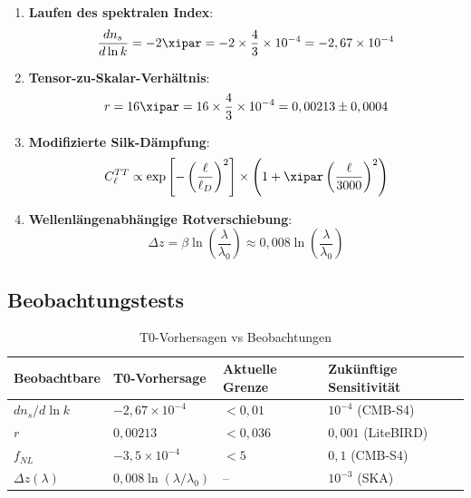 	\begin{enumerate}
		\item \textbf{Laufen des spektralen Index}:
		\begin{equation}
			\frac{dn_s}{d\ln k} = -2\xipar = -2 \times \frac{4}{3} \times 10^{-4} = -2,67 \times 10^{-4}
		\end{equation}
		
		\item \textbf{Tensor-zu-Skalar-Verhältnis}:
		\begin{equation}
			r = 16\xipar = 16 \times \frac{4}{3} \times 10^{-4} = 0,00213 \pm 0,0004
		\end{equation}
		
		\item \textbf{Modifizierte Silk-Dämpfung}:
		\begin{equation}
			C_\ell^{TT} \propto \exp\left[-\left(\frac{\ell}{\ell_D}\right)^2\right] \times \left(1 + \xipar \left(\frac{\ell}{3000}\right)^2\right)
		\end{equation}
		
		\item \textbf{Wellenlängenabhängige Rotverschiebung}:
		\begin{equation}
			\Delta z = \beta \ln\left(\frac{\lambda}{\lambda_0}\right) \approx 0,008 \ln\left(\frac{\lambda}{\lambda_0}\right)
		\end{equation}
	\end{enumerate}
	
	\subsection{Beobachtungstests}
	
	\begin{table}[htbp]
		\centering
		\caption{T0-Vorhersagen vs Beobachtungen}
		\begin{tabular}{p{3cm}p{3cm}p{3cm}p{3cm}}
			\toprule
			Beobachtbare & T0-Vorhersage & Aktuelle Grenze & Zukünftige Sensitivität \\
			\midrule
			$dn_s/d\ln k$ & $-2,67 \times 10^{-4}$ & $< 0,01$ & $10^{-4}$ (CMB-S4) \\
			$r$ & $0,00213$ & $< 0,036$ & $0,001$ (LiteBIRD) \\
			$f_{NL}$ & $-3,5 \times 10^{-4}$ & $< 5$ & $0,1$ (CMB-S4) \\
			$\Delta z(\lambda)$ & $0,008\ln(\lambda/\lambda_0)$ & -- & $10^{-3}$ (SKA) \\
			\bottomrule
		\end{tabular}
	\end{table}
	
